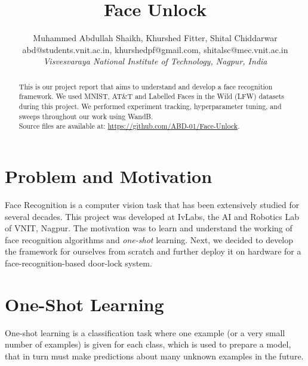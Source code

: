 \documentclass[
12pt,
tightenlines,
aps,
prb,
twocolumn,
superscriptaddress,
longbibliography,
floatfix
]{revtex4-2}
\newif\ifptitle
\newif\ifpnumber
\newcounter{para}
\newcommand\ptitle[1]{\par\refstepcounter{para}
{\ifpnumber{\noindent\textcolor{lightgray}{\textbf{\thepara}}\indent}\fi}
{\ifptitle{\textbf{[{#1}]}}\fi}}
\newcommand{\mytitle}{\Huge Face Unlock}
\begin{document}
\title{\mytitle}

\author{
Muhammed Abdullah Shaikh, Khurshed Fitter, Shital Chiddarwar\\
abd@students.vnit.ac.in, khurshedpf@gmail.com, shitalsc@mec.vnit.ac.in\\
\textit{Visvesvaraya National Institute of Technology, Nagpur, India}
}


\begin{abstract}
This is our project report that aims to understand and develop a face recognition framework. We used MNIST, AT\&T and Labelled Faces in the Wild (LFW) datasets during this project. We performed experiment tracking, hyperparameter tuning, and sweeps throughout our work using WandB.\\ Source files are available at: \url{https://github.com/ABD-01/Face-Unlock}.
\end{abstract}

\maketitle

\section{\label{sec:Start}Problem and Motivation}
Face Recognition is a computer vision task that has been extensively studied for several decades. This project was developed at IvLabs, the AI and Robotics Lab of VNIT, Nagpur. The motivation was to learn and understand the working of face recognition algorithms and \textit{one-shot} learning. Next, we decided to develop the framework for ourselves from scratch and further deploy it on hardware for a face-recognition-based door-lock system.

\section{\label{sec:oneshot}One-Shot Learning}
One-shot learning is a classification task where one example (or a very small number of examples) is given for each class, which is used to prepare a model, that in turn must make predictions about many unknown examples in the future.
\end{document}
